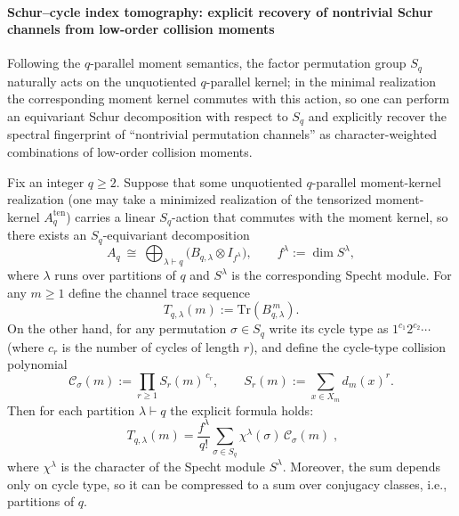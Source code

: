 \paragraph{Schur--cycle index tomography: explicit recovery of nontrivial Schur channels from low-order collision moments}
Following the \(q\)-parallel moment semantics, the factor permutation group \(S_q\) naturally acts on the unquotiented \(q\)-parallel kernel; in the minimal realization the corresponding moment kernel commutes with this action,
so one can perform an equivariant Schur decomposition with respect to \(S_q\) and explicitly recover the spectral fingerprint of ``nontrivial permutation channels'' as character-weighted combinations of low-order collision moments.

\begin{theorem}\label{thm:pom-schur-cycle-index-tomography}
Fix an integer \(q\ge 2\).
Suppose that some unquotiented \(q\)-parallel moment-kernel realization (one may take a minimized realization of the tensorized moment-kernel \(A_q^{\mathrm{ten}}\)) carries a linear \(S_q\)-action that commutes with the moment kernel,
so there exists an \(S_q\)-equivariant decomposition
\[
A_q\ \cong\ \bigoplus_{\lambda\vdash q}\bigl(B_{q,\lambda}\otimes I_{f^\lambda}\bigr),
\qquad f^\lambda:=\dim S^\lambda,
\]
where \(\lambda\) runs over partitions of \(q\) and \(S^\lambda\) is the corresponding Specht module.
For any \(m\ge 1\) define the channel trace sequence
\[
T_{q,\lambda}(m):=\mathrm{Tr}\!\left(B_{q,\lambda}^{\,m}\right).
\]
On the other hand, for any permutation \(\sigma\in S_q\) write its cycle type as \(1^{c_1}2^{c_2}\cdots\) (where \(c_r\) is the number of cycles of length \(r\)), and define the cycle-type collision polynomial
\[
\mathcal{C}_\sigma(m):=\prod_{r\ge 1} S_r(m)^{\,c_r},
\qquad
S_r(m):=\sum_{x\in X_m} d_m(x)^r.
\]
Then for each partition \(\lambda\vdash q\) the explicit formula holds:
\[
\boxed{\;
T_{q,\lambda}(m)
=
\frac{f^\lambda}{q!}\sum_{\sigma\in S_q}\chi^\lambda(\sigma)\,\mathcal{C}_\sigma(m)\; },
\]
where \(\chi^\lambda\) is the character of the Specht module \(S^\lambda\).
Moreover, the sum depends only on cycle type, so it can be compressed to a sum over conjugacy classes, i.e., partitions of \(q\).
\end{theorem}
